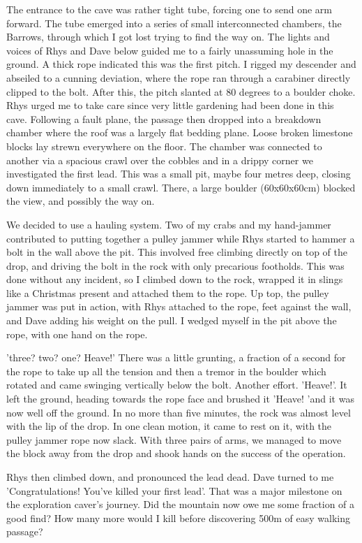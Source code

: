 	The entrance to the cave was rather tight tube, forcing one to send one arm forward. The tube emerged into a series of small interconnected chambers, the Barrows, through which I got lost trying to find the way on. The lights and voices of Rhys and Dave below guided me to a fairly unassuming hole in the ground. A thick rope indicated this was the first pitch. I rigged my descender and abseiled to a cunning deviation, where the rope ran through a carabiner directly clipped to the bolt. After this, the pitch slanted at 80 degrees to a boulder choke. Rhys urged me to take care since very little gardening had been done in this cave. Following a fault plane, the passage then dropped into a breakdown chamber where the roof was a largely flat bedding plane. Loose broken limestone blocks lay strewn everywhere on the floor. The chamber was connected to another via a spacious crawl over the cobbles and in a drippy corner we investigated the first lead. This was a small pit, maybe four metres deep, closing down immediately to a small crawl. There, a large boulder (60x60x60cm) blocked the view, and possibly the way on. 

	We decided to use a hauling system. Two of my crabs and my hand-jammer contributed to putting together a pulley jammer while Rhys started to hammer a bolt in the wall above the pit. This involved free climbing directly on top of the drop, and driving the bolt in the rock with only precarious footholds. This was done without any incident, so I climbed down to the rock, wrapped it in slings like a Christmas present and attached them to the rope. Up top, the pulley jammer was put in action, with Rhys attached to the rope, feet against the wall, and Dave adding his weight on the pull. I wedged myself in the pit above the rope, with one hand on the rope. 

	'three? two? one? Heave!' There was a little grunting, a fraction of a second  for the rope to take up all the tension and then a tremor in the boulder which rotated and came swinging vertically below the bolt. Another effort. 'Heave!'. It left the ground, heading towards the rope face and brushed it 'Heave! 'and it was now well off the ground. In no more than five minutes, the rock was almost level with the lip of the drop. In one clean motion, it came to rest on it, with the pulley jammer rope now slack. With three pairs of arms, we managed to move the block away from the drop and shook hands on the success of the operation. 

	Rhys then climbed down, and pronounced the lead dead. Dave turned to me 'Congratulations! You've killed your first lead'. That was a major milestone on the exploration caver's journey. Did the mountain now owe me some fraction of a good find? How many more would I kill before discovering 500m of easy walking passage?

